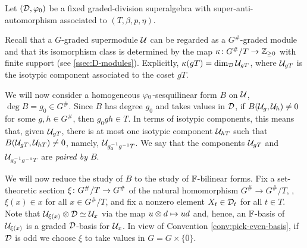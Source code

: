 Let $(\mathcal{D}, \varphi_0)$ be a fixed graded-division superalgebra with super-anti-automorphism associated to $(T, \beta, p, \eta)$.

Recall that a $G$-graded supermodule $\mathcal U$ can be regarded as a $G^\#$-graded module 
and that its isomorphism class is determined by the map $\kappa\colon G^\#/T \to \mathbb{Z}_{\geq 0}$ with finite support (see \cref{ssec:D-modules}).
Explicitly, $\kappa (gT) = \dim_{\mathcal{D}} \mathcal U_{gT}$, where $\mathcal U_{gT}$ is the isotypic component associated to the coset $gT$.


We will now consider a
homogeneous $\varphi_0$-sesquilinear form $B$ on $\mathcal U$, $\deg B = g_0 \in G^\#$.
Since $B$ has degree $g_0$ and takes values in $\mathcal{D}$, if $B(\mathcal U_{g}, \mathcal U_{h}) \neq 0$ for some $g, h \in G^\#$, then $g_0 g h \in T$.
In terms of isotypic components, this means that, given $\mathcal U_{g T}$, there is at most one isotypic component $\mathcal U_{hT}$ such that $B(\mathcal U_{gT}, \mathcal U_{hT}) \neq 0$, namely, $\mathcal U_{g_0^{-1} g^{-1} T}$.
We say that the components $\mathcal U_{gT}$ and $\mathcal U_{g_0^{-1} g^{-1} T}$ are \emph{paired by $B$}.


We will now reduce the study of $B$ to the study of $\mathbb{F}$-bilinear forms.
Fix a set-theoretic section $\xi\colon G^\#/T \to G^\#$ of the natural homomorphism $ G^\# \to G^\#/T$, \ie, $\xi (x) \in x$ for all $x \in G^\#/T$, and fix a nonzero element $X_t \in \mathcal{D}_t$ for all $t\in T$.
Note that $\mathcal U_{\xi(x)} \otimes \mathcal{D} \simeq \mathcal U_x$ via the map $u \otimes d \mapsto ud$ and, hence, an $\mathbb{F}$-basis of $\mathcal U_{\xi(x)}$ is a graded $\mathcal{D}$-basis for $\mathcal U_x$.
In view of Convention \ref{conv:pick-even-basis}, if $\mathcal{D}$ is odd we choose $\xi$ to take values in $G = G\times \{ \bar 0 \}$.

